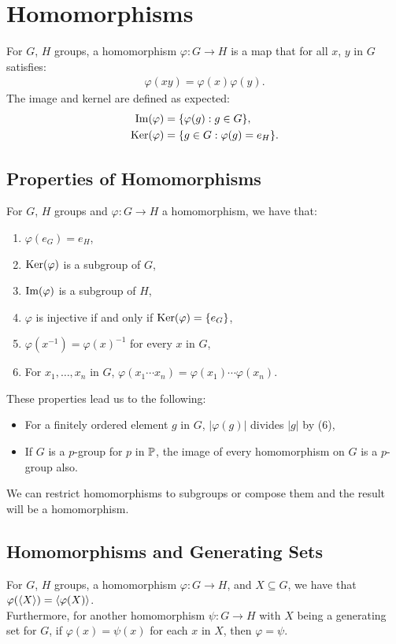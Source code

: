 \section{Homomorphisms}

For $G$, $H$ groups, a homomorphism $\varphi : G \to H$ is a map that 
for all $x$, $y$ in $G$ satisfies:
\begin{align*}
    \varphi(xy) = \varphi(x)\varphi(y).
\end{align*} The image and kernel are defined as expected: \begin{align*}
    \operatorname{Im}(\varphi) &= \{\varphi(g) : g \in G\}, \\
    \operatorname{Ker}(\varphi) &= \{g \in G : \varphi(g) = e_H\}.
\end{align*}

\subsection{Properties of Homomorphisms}

For $G$, $H$ groups and $\varphi : G \to H$ a homomorphism, we have that:
\begin{enumerate}
    \item $\varphi(e_G) = e_H$,
    \item $\operatorname{Ker}(\varphi)$ is a subgroup of $G$,
    \item $\operatorname{Im}(\varphi)$ is a subgroup of $H$,
    \item $\varphi$ is injective if and only if $\operatorname{Ker}(\varphi) = \{e_G\}$,
    \item $\varphi(x^{-1}) = \varphi(x)^{-1}$ for every $x$ in $G$,
    \item For $x_1, \ldots, x_n$ in $G$,
        $\varphi(x_1 \cdots x_n) = \varphi(x_1) \cdots \varphi(x_n)$.
\end{enumerate} These properties lead us to the following: \begin{itemize}
    \item For a finitely ordered element $g$ in $G$, $|\varphi(g)|$
        divides $|g|$ by (6),
    \item If $G$ is a $p$-group for $p$ in $\mathbb{P}$, the image of every
        homomorphism on $G$ is a $p$-group also.
\end{itemize} We can restrict homomorphisms to subgroups or compose them
and the result will be a homomorphism.

\subsection{Homomorphisms and Generating Sets}

For $G$, $H$ groups, a homomorphism $\varphi : G \to H$, and $X \subseteq G$,
we have that \linebreak $\varphi(\langle X \rangle) = \langle \varphi(X) \rangle$.
\\[\baselineskip]
Furthermore, for another homomorphism $\psi : G \to H$ with $X$ being
a generating set for $G$, if $\varphi(x) = \psi(x)$ for each $x$ in $X$,
then $\varphi = \psi$.
